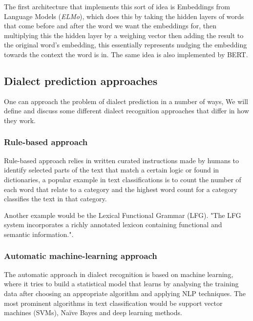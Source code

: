 \documentclass[12pt]{diazessay}
\begin{document}
            
            The first architecture that implements this sort of idea is Embeddings from Language Models (\emph{ELMo}), which does this by taking the hidden layers of words that come before and after the word we want the embeddings for, then multiplying this the hidden layer by a weighing vector then adding the result to the original word's embedding, this essentially represents nudging the embedding towards the context the word is in.
            The same idea is also implemented by BERT.
            
        

    \subsection{Dialect prediction approaches}
        One can approach the problem of dialect prediction in a number of ways, We will define and discuss some different dialect recognition approaches that differ in how they work.

        
        \subsubsection{Rule-based approach}
        Rule-based approach relies in written curated instructions made by humans to identify selected parts of the text that match a certain logic or found in dictionaries, a popular example in text classifications is to count the number of each word that relate to a category and the highest word count for a category classifies the text in that category. 
        
        Another example would be the Lexical Functional Grammar (LFG). "The LFG system incorporates a richly annotated lexicon containing functional and semantic information."\cite{hassan_2010}.

        
        \subsubsection{Automatic machine-learning approach} \label{txt:simple_voting}
        The automatic approach in dialect recognition is based on machine learning, where it tries to build a statistical model that learns by analysing the training data after choosing an appropriate algorithm and applying NLP techniques. The most prominent algorithms in text classification would be support vector machines (SVMs), Naïve Bayes and deep learning methods.
        
\end{document}

